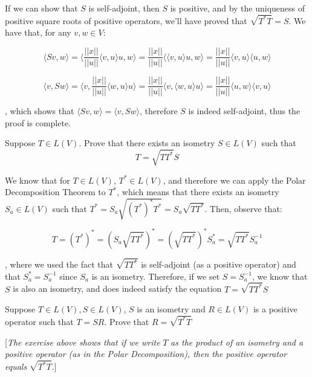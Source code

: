 \begin{solution}
    If we can show that $S$ is self-adjoint, then $S$ is positive, and by the uniqueness of positive square roots of positive operators, we'll have proved that $\sqrt{T^*T} = S$. We have that, for any $v, w \in V$:

    $$\langle Sv, w \rangle = \langle \frac{\lvert \lvert x \rvert \rvert}{\lvert \lvert u \rvert \rvert}\langle v, u \rangle u, w \rangle = \frac{\lvert \lvert x \rvert \rvert}{\lvert \lvert u \rvert \rvert} \langle \langle v, u \rangle u, w \rangle = \frac{\lvert \lvert x \rvert \rvert}{\lvert \lvert u \rvert \rvert}\langle v, u \rangle \langle u, w \rangle$$

    $$\langle v, Sw \rangle = \langle v, \frac{\lvert \lvert x \rvert \rvert}{\lvert \lvert u \rvert \rvert}\langle w, u \rangle u \rangle = \frac{\lvert \lvert x \rvert \rvert}{\lvert \lvert u \rvert \rvert} \langle v, \langle w, u \rangle u \rangle =  \frac{\lvert \lvert x \rvert \rvert}{\lvert \lvert u \rvert \rvert} \langle u, w \rangle \langle v, u \rangle$$

    , which shows that $\langle Sv, w \rangle = \langle v, Sw \rangle$, therefore $S$ is indeed self-adjoint, thus the proof is complete.
\end{solution}

\begin{exercise}{3}
    Suppose $T \in L(V)$. Prove that there exists an isometry $S \in L(V)$ such that 
    $$T = \sqrt{TT^*}S$$
\end{exercise}

\begin{solution}

    We know that for $T \in L(V)$, $T^* \in L(V)$, and therefore we can apply the Polar Decomposition Theorem to $T^*$, which means that there exists an isometry $S_a \in L(V)$ such that $T^* = S_a \sqrt{(T^*)^*T^*} = S_a \sqrt{TT^*}$. Then, observe that:

    $$T = (T^*)^* = (S_a \sqrt{TT^*})^* = (\sqrt{TT^*})^*S_a^* = \sqrt{TT^*} S_a^{-1}$$

    , where we used the fact that $\sqrt{TT^*}$ is self-adjoint (as a positive operator) and that $S_a^* = S_a^{-1}$ since $S_a$ is an isometry. Therefore, if we set $S = S_a^{-1}$, we know that $S$ is also an isometry, and does indeed satisfy the equation $T = \sqrt{TT^*}S$
\end{solution}

\begin{exercise}{8}
    Suppose $T \in L(V), S \in L(V)$, $S$ is an isometry and $R \in L(V)$ is a positive operator such that $T = SR$. Prove that $R = \sqrt{T^*T}$
    
    [\textit{The exercise above shows that if we write} $T$ \textit{as the product of an isometry and a positive operator (as in the Polar Decomposition), then the positive operator equals} $\sqrt{T^*T}$.]
\end{exercise}

